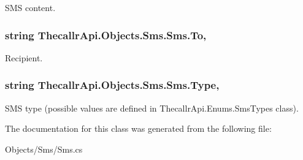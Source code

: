 S\+M\+S content. 

\hypertarget{class_thecallr_api_1_1_objects_1_1_sms_1_1_sms_aeb6c4f4712263abde25201997ca9952e}{
\subsubsection[{To}]{\setlength{\rightskip}{0pt plus 5cm}string Thecallr\+Api.\+Objects.\+Sms.\+Sms.\+To\hspace{0.3cm}{\ttfamily [get]}, {\ttfamily [set]}}}\label{class_thecallr_api_1_1_objects_1_1_sms_1_1_sms_aeb6c4f4712263abde25201997ca9952e}


Recipient. 

\hypertarget{class_thecallr_api_1_1_objects_1_1_sms_1_1_sms_a3514d7f34644b71999f47370e1679e6e}{
\subsubsection[{Type}]{\setlength{\rightskip}{0pt plus 5cm}string Thecallr\+Api.\+Objects.\+Sms.\+Sms.\+Type\hspace{0.3cm}{\ttfamily [get]}, {\ttfamily [set]}}}\label{class_thecallr_api_1_1_objects_1_1_sms_1_1_sms_a3514d7f34644b71999f47370e1679e6e}


S\+M\+S type (possible values are defined in Thecallr\+Api.\+Enums.\+Sms\+Types class). 



The documentation for this class was generated from the following file\+:\begin{DoxyCompactItemize}
\item 
Objects/\+Sms/Sms.\+cs\end{DoxyCompactItemize}
